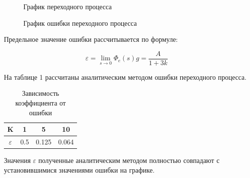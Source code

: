 \documentclass[a4paper, 11pt]{article}
\begin{document}
\begin{figure}[h!]
    \caption{График переходного процесса}
    \label{two}
\end{figure}

\newpage

\begin{figure}[h!]
    \caption{График ошибки переходного процесса}
    \label{tree}
\end{figure}


Предельное значение ошибки рассчитывается по формуле:

\begin{equation}
	\varepsilon = \lim_{s\to 0}{\Phi_e(s)}g =\frac {A}{1+3k}
\end{equation}

На таблице 1 рассчитаны аналитическим методом ошибки переходного процесса.

\begin{table}[h]
	\begin{center}
		\caption{Зависимость коэффициента от ошибки}
		\begin{tabular}{|c|c|c|c|}
			\hline
			K & 1 & 5 & 10 \\
			\hline
			$\varepsilon$ & 0.5 & 0.125 & 0.064 \\
			\hline     
		\end{tabular}
		\label{tab:my_label}
	\end{center}
\end{table}

Значения $\varepsilon$ полученные аналитическим методом полностью совпадают с установившимися значениями ошибки на графике.
\end{document}
